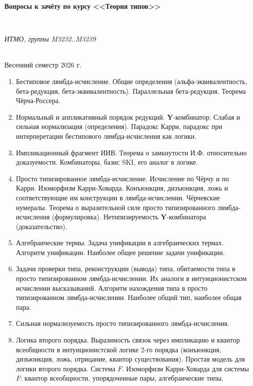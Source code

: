 \documentclass[11pt,a4paper,oneside]{article}
\begin{document}
\begin{center}
\begin{Large}{\bfseries Вопросы к зачёту по курсу <<Теория типов>>}\end{Large}\\
\vspace{1mm}
\begin{small} \itshape ИТМО, группы M3232..M3239\end{small}\\
\small Весенний семестр 2026 г.
\end{center}

\begin{enumerate}
\item Бестиповое лямбда-исчисление. Общие определения (альфа-эквивалентность, бета-редукция, бета-эквивалентность).
Параллельная бета-редукция. Теорема Чёрча-Россера.
\item Нормальный и аппликативный порядок редукций. \textbf{Y}-комбинатор. Слабая и сильная нормализация (определения).
Парадокс Карри, парадокс при интерперетации бестипового лямбда-исчисления как логики.
\item Импликационный фрагмент ИИВ. Теорема о замкнутости И.Ф. относительно доказуемости.
Комбинаторы, базис SKI, его аналог в логике.
\item Просто типизированное лямбда-исчисление. Исчисление по Чёрчу и по Карри. Изоморфизм Карри-Ховарда.
Конъюнкция, дизъюнкция, ложь и соответствующие им конструкции в лямбда-исчислении. 
Чёрчевские нумералы. Теорема о выразительной силе просто типизированного лямбда-исчисления (формулировка).
Нетипизируемость \textbf{Y}-комбинатора (доказательство).
\item Алгебраические термы. Задача унификации в алгебраических термах. Алгоритм унификации. Наиболее общее решение задачи унификации.
\item Задачи проверки типа, реконструкции (вывода) типа, обитаемости типа в просто типизированном лямбда-исчислении.
Их аналоги в интуиционистском исчислении высказываний. 
Алгоритм нахождения типа в просто типизированном лямбда-исчислении. Наиболее общий тип, наиболее общая пара.
\item Сильная нормализуемость просто типизированного лямбда-исчисления.
\item Логика второго порядка. Выразимость связок через импликацию и квантор всеобщности в интуиционистской логике 
2-го порядка (конъюнкция, дизъюнкция, ложь, отрицание, квантор существования). Простая модель для логики второго порядка.
Система $F$. Изоморфизм Карри-Ховарда для системы $F$: квантор всеобщности, упорядоченные пары, алгебраические типы.

\end{enumerate}
\end{document}
